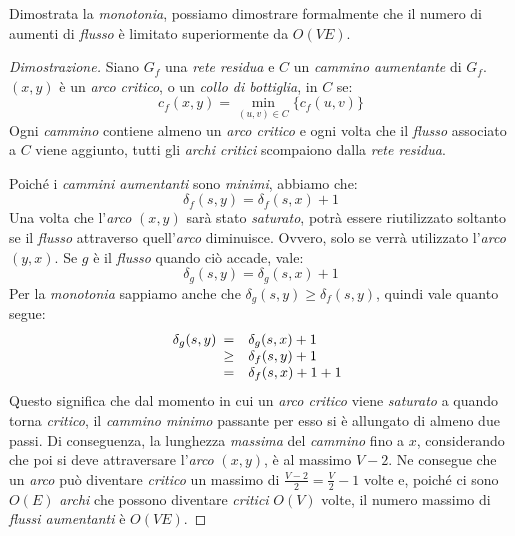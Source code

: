 \noindent
Dimostrata la \emph{monotonia}, possiamo dimostrare formalmente che il numero
di aumenti di \emph{flusso} è limitato superiormente da $O(VE)$.

\begin{proof}[Dimostrazione]
    Siano $G_f$ una \emph{rete residua} e $C$ un \emph{cammino aumentante} di
    $G_f$. $(x,y)$ è un \emph{arco critico}, o un \emph{collo di bottiglia},
    in $C$ se:
    \[c_f(x,y)=\min_{(u,v)\in C}\{c_f(u,v)\}\]
    Ogni \emph{cammino} contiene almeno un \emph{arco critico} e ogni volta che
    il \emph{flusso} associato a $C$ viene aggiunto, tutti gli \emph{archi
    critici} scompaiono dalla \emph{rete residua}.

    \noindent
    Poiché i \emph{cammini aumentanti} sono \emph{minimi}, abbiamo che:
    \[\delta_f(s,y)=\delta_f(s,x)+1\]
    Una volta che l'\emph{arco} $(x,y)$ sarà stato \emph{saturato}, potrà essere
    riutilizzato soltanto se il \emph{flusso} attraverso quell'\emph{arco}
    diminuisce. Ovvero, solo se verrà utilizzato l'\emph{arco} $(y,x)$.
    Se $g$ è il \emph{flusso} quando ciò accade, vale:
    \[\delta_g(s,y)=\delta_g(s,x)+1\]
    Per la \emph{monotonia} sappiamo anche che $\delta_g(s,y)\geq\delta_f(s,y)$,
    quindi vale quanto segue:
    \[\delta_g(s,y)\begin{array}[t]{cl}
        = & \delta_g(s,x)+1\\
        \geq & \delta_f(s,y)+1\\
        = & \delta_f(s,x)+1+1
    \end{array}\]
    Questo significa che dal momento in cui un \emph{arco critico} viene
    \emph{saturato} a quando torna \emph{critico}, il \emph{cammino minimo}
    passante per esso si è allungato di almeno due passi. Di conseguenza, la
    lunghezza \emph{massima} del \emph{cammino} fino a $x$, considerando che
    poi si deve attraversare l'\emph{arco} $(x,y)$, è al massimo $V-2$. Ne
    consegue che un \emph{arco} può diventare \emph{critico} un massimo di
    $\frac{V-2}{2}=\frac{V}{2}-1$ volte e, poiché ci sono $O(E)$ \emph{archi}
    che possono diventare \emph{critici} $O(V)$ volte, il numero massimo di
    \emph{flussi aumentanti} è $O(VE)$.
\end{proof}

